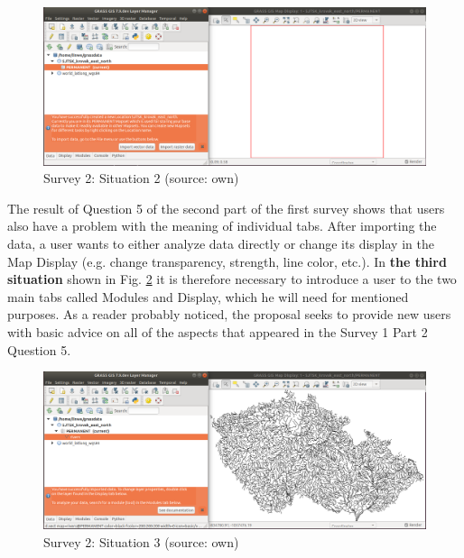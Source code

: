\documentclass[a4paper,10pt,twoside]{article}
\begin{document}
\vspace{0.3cm}
\begin{figure}[hbt!] 
\begin{center}
\includegraphics[width=17cm]{../pictures/grass_infobar_2.png} 
\caption[Survey 2: Situation 2]{Survey 2: Situation 2 (source: own)}
\label{fig:grass_infobar_2}
\end{center}
\end{figure}

\noindent The result of Question 5 of the second part of the first survey shows that users also have a problem with the meaning of individual tabs. After importing the data, a user wants to either analyze data directly or change its display in the Map Display (e.g. change transparency, strength, line color, etc.). In \textbf{the third situation} shown in Fig. \ref{fig:grass_infobar_3} it is therefore necessary to introduce a user to the two main tabs called Modules and Display, which he will need for mentioned purposes. As a reader probably noticed, the proposal seeks to provide new users with basic advice on all of the aspects that appeared in the Survey 1 Part 2 Question 5.

\vspace{0.3cm}
\begin{figure}[hbt!] 
\begin{center}
\includegraphics[width=17cm]{../pictures/grass_infobar_3.png} 
\caption[Survey 2: Situation 3]{Survey 2: Situation 3 (source: own)}
\label{fig:grass_infobar_3}
\end{center}
\end{figure}
\end{document}
